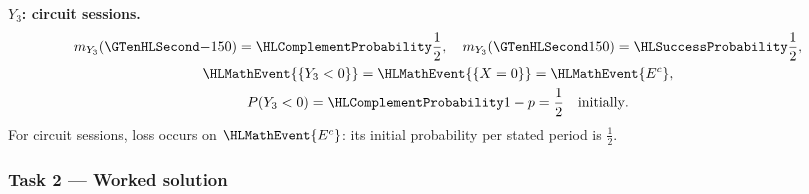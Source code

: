 \noindent\begin{minipage}[t]{.48\linewidth}
\textbf{$Y_3$: circuit sessions.}
\[
\begin{gathered}
m_{Y_3}(\Money{-150})=\FailureProb{\frac{1}{2}},\quad m_{Y_3}(\Money{150})=\SuccessProb{\frac{1}{2}},\\
\HLMathEvent{\{Y_3<0\}}=\HLMathEvent{\{X=0\}}=\HLMathEvent{E^c},\\
P(Y_3<0)=\FailureProb{1-p}= \frac{1}{2}\quad\text{initially}.
\end{gathered}
\]
For circuit sessions, loss occurs on $\HLMathEvent{E^c}$: its initial probability per stated period is $\frac{1}{2}$.
\end{minipage}\par
\CThreeModelAgriculture
{}
\clearpage\subsubsection*{Task 2 --- Worked solution}\label{sol:c3-agriculture-decision}
\CThreeTaskTwo

